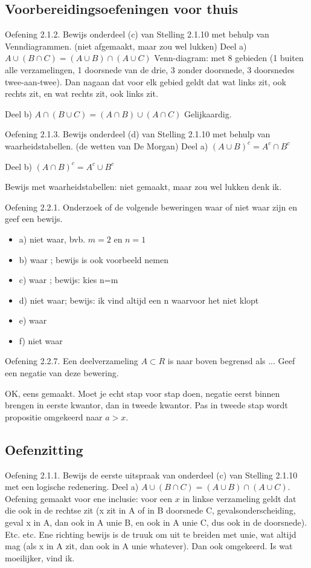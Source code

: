 \documentclass{article}
\begin{document}
\subsection*{Voorbereidingsoefeningen voor thuis} 

Oefening 2.1.2. Bewijs onderdeel (c) van Stelling 2.1.10 met behulp van Venndiagrammen.
(niet afgemaakt, maar zou wel lukken) 
Deel a) $A \cup (B \cap C) = (A \cup B) \cap (A \cup C) $
Venn-diagram: met 8 gebieden (1 buiten alle verzamelingen, 1 doorsnede van de drie, 3 zonder doorsnede, 3 doorsnedes twee-aan-twee). 
Dan nagaan dat voor elk gebied geldt dat wat links zit, ook rechts zit, en wat rechts zit, ook links zit. 

Deel b) $A \cap (B \cup C) = (A \cap B) \cup (A \cap C)$
Gelijkaardig. 

Oefening 2.1.3. Bewijs onderdeel (d) van Stelling 2.1.10 met behulp van waarheidstabellen.
(de wetten van De Morgan)
Deel a) $(A \cup B)^c = A^c \cap B^c$ 

Deel b) $(A \cap B)^c = A^c \cup B^c$ 

Bewijs met waarheidstabellen: niet gemaakt, maar zou wel lukken denk ik. 

Oefening 2.2.1. Onderzoek of de volgende beweringen waar of niet waar zijn en geef een
bewijs.
\begin{itemize}
\item a) niet waar, bvb. $m=2$ en $n=1$
\item b) waar ; bewijs is ook voorbeeld nemen
\item c) waar ; bewijs: kies n=m 
\item d) niet waar; bewijs: ik vind altijd een n waarvoor het niet klopt
\item e) waar
\item f) niet waar

\end{itemize}

Oefening 2.2.7. Een deelverzameling $A \subset R$ is naar boven begrensd als ... Geef een negatie van deze bewering. 

OK, eens gemaakt. Moet je echt stap voor stap doen, negatie eerst binnen brengen in eerste kwantor, dan in tweede kwantor. Pas in tweede stap wordt propositie omgekeerd naar $a>x$. 

\subsection{Oefenzitting}

Oefening 2.1.1. Bewijs de eerste uitspraak van onderdeel (c) van Stelling 2.1.10 met een logische redenering.
Deel a) $A \cup (B \cap C) = (A \cup B) \cap (A \cup C) $. Oefening gemaakt voor ene inclusie: voor een $x$ in linkse verzameling geldt dat die ook in de rechtse zit (x zit in A of in B doorsnede C, gevalsonderscheiding, geval x in A, dan ook in A unie B, en ook in A unie C, dus ook in de doorsnede). Etc. etc. 
Ene richting bewijs is de truuk om uit te breiden met unie, wat altijd mag (als x in A zit, dan ook in A unie whatever). Dan ook omgekeerd. Is wat moeilijker, vind ik. 
\end{document}
